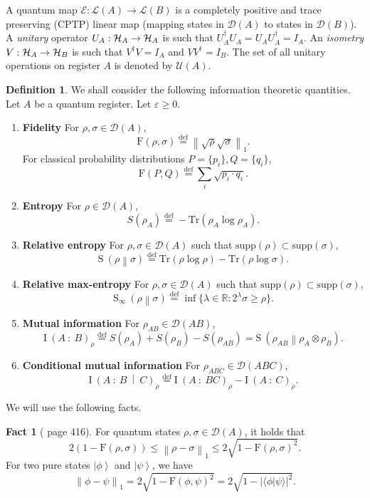 \documentclass[11pt,a4paper]{article}
\def\F{\mathrn{F}}
\def\H{\CMcal{H}}
\theoremstyle{plain}
\theoremstyle{definition}
\newtheorem{definition}[theorem]{Definition}
\newtheorem{fact}[theorem]{Fact}
\newcommand {\br} [1] {\ensuremath{ \left( #1 \right) }}
\newcommand {\minusspace} {\: \! \!}
\newcommand {\smallspace} {\: \!}
\newcommand {\fn} [2] {\ensuremath{ #1 \minusspace \br{ #2 } }}
\newcommand {\defeq} {\ensuremath{ \stackrel{\mathrm{def}}{=} }}
\newcommand {\mutinf} [2] {\fn{\mathrm{I}}{#1 \smallspace : \smallspace #2}}
\newcommand {\condmutinf} [3] {\mutinf{#1}{#2 \smallspace \middle\vert \smallspace #3}}
\newcommand {\abs} [1] {\ensuremath{ \left| #1 \right| }}
\newcommand {\norm} [1] {\ensuremath{ \left\| #1 \right\| }}
\newcommand {\normsub} [2] {\ensuremath{ \norm{#1}_{#2} }}
\newcommand {\onenorm} [1] {\normsub{#1}{1}}
\newcommand {\relent} [2] {\fn{\mathrm{S}}{#1 \middle\| #2}}
\newcommand {\rminent} [2] {\fn{\mathrm{S}_{\infty}}{#1 \middle\| #2}}
\newcommand {\ket} [1] {\ensuremath{ \left| #1 \right\rangle }}
\newcommand {\Tr} {\ensuremath{ \mathrm{Tr} }}
\def\F{\mathrm{F}}
\def\E{\mathcal{E}}
\begin{document}
A quantum {map} $\E: \mathcal{L}(A)\rightarrow \mathcal{L}(B)$ is a completely positive and trace preserving (CPTP) linear map (mapping states in $\mathcal{D}(A)$ to states in $\mathcal{D}(B)$). A {\em unitary} operator $U_A:\H_A \rightarrow \H_A$ is such that $U_A^{\dagger}U_A = U_A U_A^{\dagger} = I_A$. An {\em isometry}  $V:\H_A \rightarrow \H_B$ is such that $V^{\dagger}V = I_A$ and $VV^{\dagger} = I_B$. The set of all unitary operations on register $A$ is  denoted by $\mathcal{U}(A)$.

\begin{definition}
We shall consider the following information theoretic quantities. Let $A$ be a quantum register. Let $\varepsilon \geq 0$. 
\begin{enumerate}
\item {\bf Fidelity} For $\rho,\sigma \in \mathcal{D}(A)$, $$\F(\rho,\sigma)\defeq\onenorm{\sqrt{\rho}\sqrt{\sigma}}.$$ For classical probability distributions $P = \{p_i\}, Q =\{q_i\}$, $$\F(P,Q)\defeq \sum_i \sqrt{p_i \cdot q_i}.$$
\item {\bf Entropy} For $\rho\in\mathcal{D}(A)$, $$S(\rho_A) \defeq - \Tr(\rho_A\log\rho_A) .$$ 
\item {\bf Relative entropy} For $\rho,\sigma\in \mathcal{D}(A)$ such that $\text{supp}(\rho) \subset \text{supp}(\sigma)$, $$\relent{\rho}{\sigma} \defeq \Tr(\rho\log\rho) - \Tr(\rho\log\sigma) .$$ 
\item {\bf Relative max-entropy} For $\rho,\sigma\in \mathcal{D}(A)$ such that $\text{supp}(\rho) \subset \text{supp}(\sigma)$, $$ \rminent{\rho}{\sigma}  \defeq  \inf \{ \lambda \in \mathbb{R} : 2^{\lambda} \sigma \geq \rho \}  .$$
\item {\bf Mutual information} For $\rho_{AB}\in \mathcal{D}(AB)$, $$\mutinf{A}{B}_{\rho}\defeq S(\rho_A) + S(\rho_B)-S(\rho_{AB}) = \relent{\rho_{AB}}{\rho_A\otimes\rho_B}.$$
\item {\bf Conditional mutual information} For $\rho_{ABC}\in\mathcal{D}(ABC)$, $$\condmutinf{A}{B}{C}_{\rho}\defeq \mutinf{A}{BC}_{\rho}-\mutinf{A}{C}_{\rho}.$$
\end{enumerate}
\label{def:infquant}
\end{definition}

We will use the following facts.
\begin{fact}[\cite{NielsenC00} page 416]
	\label{fact:tracefidelityequi}
	For quantum states $\rho,\sigma \in \mathcal{D}(A)$, it holds that
	\[2(1-\F(\rho,\sigma))\leq\onenorm{\rho-\sigma}\leq2\sqrt{1-\F(\rho,\sigma)^2}.\]
For two pure states $\ket{\phi}$ and $\ket{\psi}$, we have
\[\onenorm{\phi-\psi}=2 \sqrt{1-\F(\phi, \psi)^2}=2 \sqrt{1-\abs{\langle\phi|\psi\rangle}^2}.\]
\end{fact}
\end{document}
